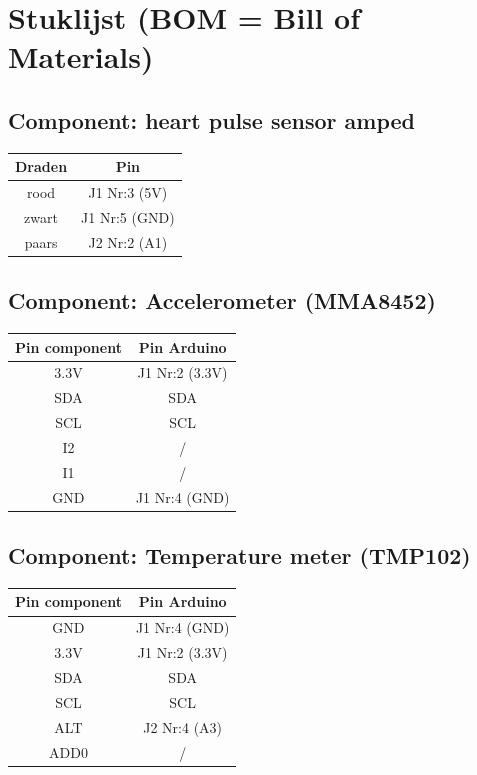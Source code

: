 \documentclass[a4paper]{report}
\begin{document}
\section{Stuklijst (BOM = Bill of Materials)}
\subsection{Component: heart pulse sensor amped}
\begin{tabular}{|c|c|}
    \hline
    Draden & Pin\\
    \hline
    rood  & J1 Nr:3 (5V)\\
    zwart & J1 Nr:5 (GND)\\
    paars & J2 Nr:2 (A1)\\
    \hline
\end{tabular}

\subsection{Component: Accelerometer (MMA8452)}
\begin{tabular}{|c|c|}
    \hline
    Pin component & Pin Arduino\\
    \hline
    3.3V & J1 Nr:2 (3.3V)\\
    SDA  & SDA\\
    SCL  & SCL\\
    I2   & /\\
    I1   & /\\
    GND  & J1 Nr:4 (GND)\\
    \hline
\end{tabular}

\subsection{Component: Temperature meter (TMP102)}
\begin{tabular}{|c|c|}
    \hline
    Pin component & Pin Arduino\\
    \hline
    GND  & J1 Nr:4  (GND)\\
    3.3V & J1 Nr:2  (3.3V)\\
    SDA  & SDA\\
    SCL  & SCL\\
    ALT  & J2 Nr:4  (A3)\\
    ADD0 & /\\
    \hline
\end{tabular}
\end{document}
